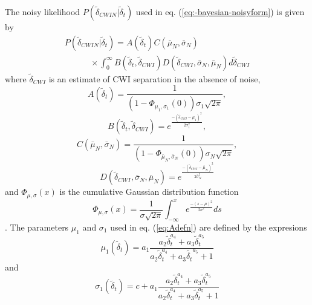 \documentclass[extra]{gji}
\begin{document}
The noisy likelihood $P(\widetilde{\delta}_{CWIN}|\widetilde{\delta}_t)$
used in eq. (\ref{eq:-bayesian-noisyform}) is given by
\begin{equation}
\begin{array}{l}
\label{eq-likelihood-int}
P(\widetilde{\delta}_{CWIN}|\widetilde{\delta}_t)  =
A(\widetilde{\delta}_t) C(\bar{\mu}_N, \bar{\sigma}_N)  \\
\hspace{3em} \times \int_0^\infty
B(\widetilde{\delta}_t,\widetilde{\delta}_{CWI})
D(\widetilde{\delta}_{CWI},\bar{\sigma}_N,\bar{\mu}_N )
d\widetilde{\delta}_{CWI}
\end{array}
\end{equation}
where $\widetilde{\delta}_{CWI}$ is an estimate of CWI separation in the absence
of noise,
\begin{equation}
\label{eq:Adefn}
A(\widetilde{\delta}_t) = \frac{1}{(1-\Phi_{\mu_1,\sigma_1}(0))\sigma_1\sqrt{2\pi} },
\end{equation}
\begin{equation}
B(\widetilde{\delta}_t,\widetilde{\delta}_{CWI})=e^{  \frac{-(\widetilde{\delta}_{CWI}-\mu_1)^2}{2\sigma_1^2} },
\end{equation}
\begin{equation}
\label{eq:Cdefn}
C(\bar{\mu}_N, \bar{\sigma}_N) =  \frac{1}{(1-\Phi_{\bar{\mu}_N,\bar{\sigma}_N}(0))\sigma_N\sqrt{2\pi}},
\end{equation}
\begin{equation}
D(\widetilde{\delta}_{CWI},\bar{\sigma}_N,\bar{\mu}_N )=e^{  \frac{-(\widetilde{\delta}_{CWI}-\bar{\mu}_N)^2}{2 \bar{\sigma}_N ^2} }
\end{equation}
and $\Phi_{\mu,\sigma}(x)$ is the cumulative Gaussian distribution function
\begin{equation}
\label{eq-cummulative-Gaussian}
\Phi_{\mu,\sigma}(x) = \frac{1}{\sigma \sqrt{2 \pi}}
\int_{-\infty}^x e^{  \frac{-(s-\mu)^2}{2\sigma^2}  } ds
\end{equation}
\citep{dr_Robinson11a}. The parameters $\mu_1$ and $\sigma_1$ used
in eq. (\ref{eq:Adefn}) are defined by the expresions
\begin{equation}
\label{eq:mu1}
\mu_1(\widetilde{\delta}_t) = a_1\frac{a_2 \widetilde{\delta}_t^{a_4}+a_3
\widetilde{\delta}_t^{a_5}}{a_2 \widetilde{\delta}_t^{a_4}+a_3 \widetilde{\delta_t}^{a_5}+1}
\end{equation}
and
\begin{equation}
\label{eq:sigma1}
\sigma_1(\widetilde{\delta}_t) = c + a_1\frac{a_2 \widetilde{\delta}_t^{a_4}+
a_3 \widetilde{\delta}_t^{a_5}}{a_2 \widetilde{\delta}_t^{a_4}+a_3 \widetilde{\delta}_t^{a_5}+1}
\end{equation}
\end{document}
